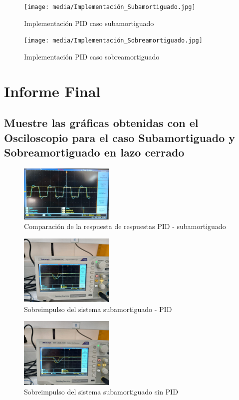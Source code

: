 \documentclass[conference]{IEEEtran}
\begin{document}
	\begin{figure}[h]
		\centering
		\texttt{[image: media/Implementación\_Subamortiguado.jpg]}
		\caption{Implementación PID caso subamortiguado}
		\label{fig:enter-label}
	\end{figure}
	
	\begin{figure}
		\centering
		\texttt{[image: media/Implementación\_Sobreamortiguado.jpg]}
		\caption{Implementación PID caso sobreamortiguado}
		\label{fig:enter-label}
	\end{figure}
	\section{\textbf{Informe Final}}
	\subsection{\textbf{Muestre las gráficas obtenidas con el Osciloscopio para el caso Subamortiguado y Sobreamortiguado en lazo cerrado}}   
	
	\begin{figure}[h]
		\centering
		\includegraphics[width=0.4\textwidth]{media/sub-respuesta-general.jpeg}
		\caption{Comparación de la respuesta de respuestas PID - subamortiguado}
		\label{fig:sub-respuesta-general}
	\end{figure}
	
	\begin{figure}[h]
		\centering
		\includegraphics[width=0.4\textwidth]{media/sub-sobrepico-104.jpeg}
		\caption{Sobreimpulso del sistema subamortiguado - PID}
		\label{fig:sub-sobrepico-104}
	\end{figure}
	
	\begin{figure}[h]
		\centering
		\includegraphics[width=0.4\textwidth]{media/sub-sobrepico-116.jpeg}
		\caption{Sobreimpulso del sistema subamortiguado sin PID}
		\label{fig:sub-sobrepico-116}
	\end{figure}
	
\end{document}
